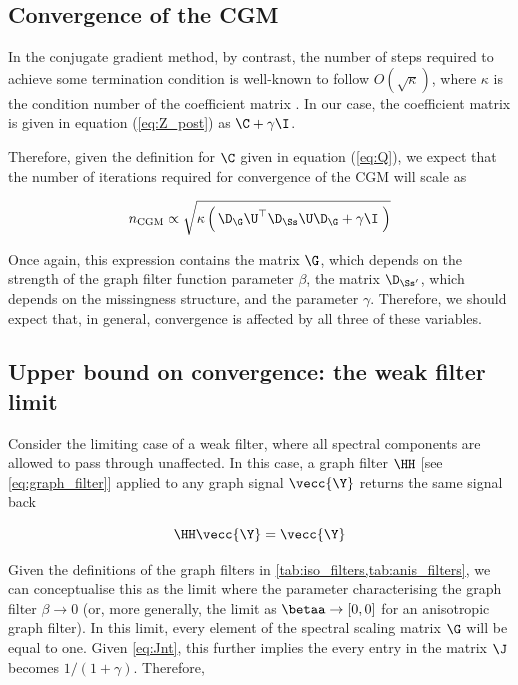 \subsection{Convergence of the CGM}

In the conjugate gradient method, by contrast, the number of steps required to achieve some termination condition is well-known to follow $O(\sqrt{\kappa})$, where $\kappa$ is the condition number of the coefficient matrix \cite{Kelley1995}. In our case, the coefficient matrix is given in equation (\ref{eq:Z_post}) as $\C + \gamma \I$. 



Therefore, given the definition for $\C$ given in equation (\ref{eq:Q}), we expect that the number of iterations required for convergence of the CGM will scale as

\begin{equation}
    \label{eq:n_CGM}
     n_{\text{CGM}} \propto \sqrt{\kappa \left(  \, \D_\G \U^\top \D_{\Ss} \U \D_\G + \gamma \I \; \right)}
\end{equation}

Once again, this expression contains the matrix $\G$, which depends on the strength of the graph filter function parameter $\beta$, the matrix $\D_{\Ss'}$, which depends on the missingness structure, and the parameter $\gamma$. Therefore, we should expect that, in general, convergence is affected by all three of these variables. 


\subsection{Upper bound on convergence: the weak filter limit}

Consider the limiting case of a weak filter, where all spectral components are allowed to pass through unaffected. In this case, a graph filter $\HH$ [see \cref{eq:graph_filter}] applied to any graph signal $\vecc{\Y}$ returns the same signal back 

$$
\HH \vecc{\Y} = \vecc{\Y}
$$

Given the definitions of the graph filters in \cref{tab:iso_filters,tab:anis_filters}, we can conceptualise this as the limit where the parameter characterising the graph filter $\beta \rightarrow 0$ (or, more generally, the limit as $\betaa \rightarrow [0, 0]$ for an anisotropic graph filter). In this limit, every element of the spectral scaling matrix $\G$ will be equal to one. Given \cref{eq:Jnt}, this further implies the every entry in the matrix $\J$ becomes $1 / (1 + \gamma)$. Therefore, 


